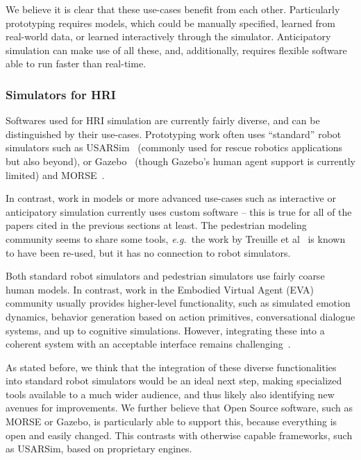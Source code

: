 \documentclass{llncs}
\newcommand{\eg}{{\textit{e.g.~}}}
\begin{document}
We believe it is clear that these use-cases benefit from each other. Particularly
prototyping requires models, which could be manually specified, learned from 
real-world data, or learned interactively through the simulator. Anticipatory
simulation can make use of all these, and, additionally, requires flexible software
able to run faster than real-time.

\subsubsection*{Simulators for HRI}

Softwares used for HRI simulation are currently fairly diverse, and can be
distinguished by their use-cases. Prototyping work often uses
``standard'' robot simulators such as USARSim~\cite{lewis2007usarsim}
(commonly used for rescue robotics applications but also beyond), or
Gazebo~\cite{Koenig2004} (though Gazebo's human agent support
is currently limited) and MORSE~\cite{morse_simpar_2012}. 

In contrast, work in models or more advanced use-cases such as interactive or
anticipatory simulation currently uses custom software -- this is true for all
of the papers cited in the previous sections at least. The pedestrian modeling
community seems to share some tools, \eg the work by Treuille et 
al~\cite{treuille2006continuum} is known to have been re-used, but it has no 
connection to robot simulators.

Both standard robot simulators and pedestrian simulators use fairly coarse 
human models. In contrast, work in the Embodied Virtual Agent (EVA) community
usually provides higher-level functionality, such as simulated emotion dynamics, behavior
generation based on action primitives, conversational dialogue systems, and up
to cognitive simulations. However, integrating these into a coherent system with
an acceptable interface remains challenging~\cite{gratch2002creating}.

As stated before, we think that the integration of these diverse functionalities
into standard robot simulators would be an ideal next step, making specialized
tools available to a much wider audience, and thus likely also identifying new
avenues for improvements. We further believe that Open Source software, such as
MORSE or Gazebo, is particularly able to support this, because everything is open
and easily changed. This contrasts with otherwise capable frameworks, such as
USARSim, based on proprietary engines.
\end{document}
